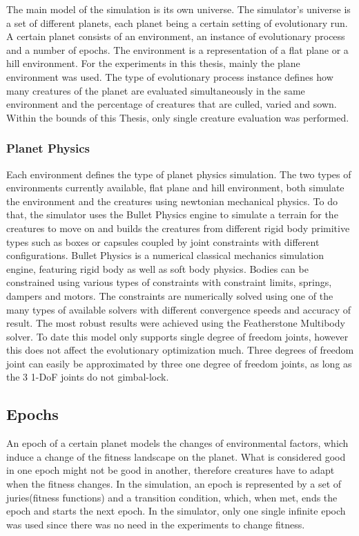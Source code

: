 \documentclass[main]{subfiles}
\begin{document}
The main model of the simulation is its own universe. %
%
The simulator's universe is a set of different planets, each planet being a certain setting of evolutionary run. %
%
A certain planet consists of an environment, an instance of evolutionary process and a number of epochs. %
%
The environment is a representation of a flat plane or a hill environment. %
%
For the experiments in this thesis, mainly the plane environment was used. %
%
The type of evolutionary process instance defines how many creatures of the planet are evaluated simultaneously in the same environment and the percentage of creatures that are culled, varied and sown. %
%
Within the bounds of this Thesis, only single creature evaluation was performed. 

\subsubsection{Planet Physics}

Each environment defines the type of planet physics simulation. %
%
The two types of environments currently available, flat plane and hill environment, both simulate the environment and the creatures using newtonian mechanical physics. %
%
To do that, the simulator uses the Bullet Physics engine\cite{bib:BulletPhysics2015} to simulate a terrain for the creatures to move on and builds the creatures from different rigid body primitive types such as boxes or capsules coupled by joint constraints with different configurations. %
%
Bullet Physics is a numerical classical mechanics simulation engine, featuring rigid body as well as soft body physics. %
%
Bodies can be constrained using various types of constraints with constraint limits, springs, dampers and motors. %
%
The constraints are numerically solved using one of the many types of available solvers with different convergence speeds and accuracy of result. %
%
The most robust results were achieved using the Featherstone Multibody solver. %
%
To date this model only supports single degree of freedom joints, however this does not affect the evolutionary optimization much. %
%
Three degrees of freedom joint can easily be approximated by three one degree of freedom joints, as long as the 3 1-DoF joints do not gimbal-lock.

\subsection{Epochs}

An epoch of a certain planet models the changes of environmental factors, which induce a change of the fitness landscape on the planet. %
%
What is considered good in one epoch might not be good in another, therefore creatures have to adapt when the fitness changes. %
%
In the simulation, an epoch is represented by a set of juries(fitness functions) and a transition condition, which, when met, ends the epoch and starts the next epoch. %
%
In the simulator, only one single infinite epoch was used since there was no need in the experiments to change fitness.
\end{document}
